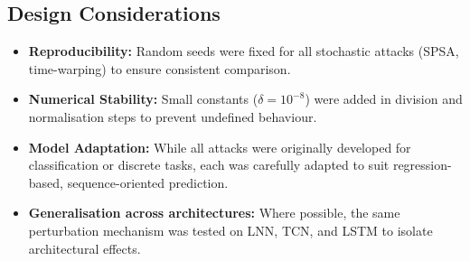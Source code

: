 \subsection{Design Considerations}
\begin{itemize}
    \item \textbf{Reproducibility:} Random seeds were fixed for all stochastic attacks (SPSA, time-warping) to ensure consistent comparison.
    \item \textbf{Numerical Stability:} Small constants ($\delta = 10^{-8}$) were added in division and normalisation steps to prevent undefined behaviour.
    \item \textbf{Model Adaptation:} While all attacks were originally developed for classification or discrete tasks, each was carefully adapted to suit regression-based, sequence-oriented prediction.
    \item \textbf{Generalisation across architectures:} Where possible, the same perturbation mechanism was tested on LNN, TCN, and LSTM to isolate architectural effects.
\end{itemize}